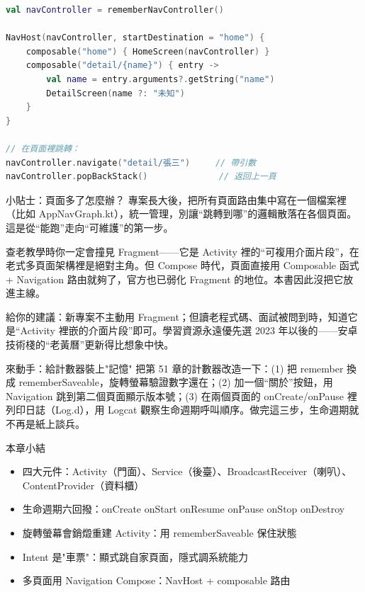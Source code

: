 \begin{lstlisting}[language=Kotlin]
val navController = rememberNavController()

NavHost(navController, startDestination = "home") {
    composable("home") { HomeScreen(navController) }
    composable("detail/{name}") { entry ->
        val name = entry.arguments?.getString("name")
        DetailScreen(name ?: "未知")
    }
}

// 在頁面裡跳轉：
navController.navigate("detail/張三")     // 帶引數
navController.popBackStack()              // 返回上一頁
\end{lstlisting}

\begin{tcbinfo}{小貼士：頁面多了怎麼辦？}
專案長大後，把所有頁面路由集中寫在一個檔案裡（比如 AppNavGraph.kt），統一管理，別讓“跳轉到哪”的邏輯散落在各個頁面。這是從“能跑”走向“可維護”的第一步。

\end{tcbinfo}


查老教學時你一定會撞見 Fragment——它是 Activity 裡的“可複用介面片段”，在老式多頁面架構裡是絕對主角。但 Compose 時代，頁面直接用 Composable 函式 + Navigation 路由就夠了，官方也已弱化 Fragment 的地位。本書因此沒把它放進主線。

給你的建議：新專案不主動用 Fragment；但讀老程式碼、面試被問到時，知道它是“Activity 裡嵌的介面片段”即可。學習資源永遠優先選 2023 年以後的——安卓技術棧的“老黃曆”更新得比想象中快。

\begin{tcbpractice}{來動手：給計數器裝上"記憶"}
把第 51 章的計數器改造一下：(1) 把 remember 換成 rememberSaveable，旋轉螢幕驗證數字還在；(2) 加一個“關於”按鈕，用 Navigation 跳到第二個頁面顯示版本號；(3) 在兩個頁面的 onCreate/onPause 裡列印日誌（Log.d），用 Logcat 觀察生命週期呼叫順序。做完這三步，生命週期就不再是紙上談兵。

\end{tcbpractice}

\begin{tcbsummary}{本章小結}
\begin{itemize}
  \item 四大元件：Activity（門面）、Service（後臺）、BroadcastReceiver（喇叭）、ContentProvider（資料櫃）
  \item 生命週期六回撥：onCreate onStart onResume onPause onStop onDestroy
  \item 旋轉螢幕會銷燬重建 Activity：用 rememberSaveable 保住狀態
  \item Intent 是"車票"：顯式跳自家頁面，隱式調系統能力
  \item 多頁面用 Navigation Compose：NavHost + composable 路由
\end{itemize}

\end{tcbsummary}

